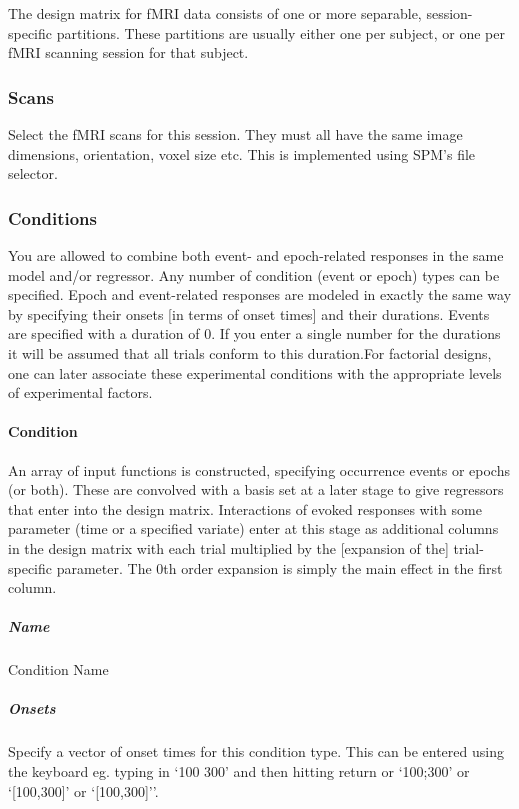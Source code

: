 The design matrix for fMRI data consists of one or more separable, session-specific partitions.  These partitions are usually either one per subject, or one per fMRI scanning session for that subject.

\subsubsection{Scans}

Select the fMRI scans for this session.  They must all have the same image dimensions, orientation, voxel size etc. This is implemented using SPM's file selector.

\subsubsection{Conditions}

You are allowed to combine both event- and epoch-related responses in the same model and/or regressor. Any number of condition (event or epoch) types can be specified.  Epoch and event-related responses are modeled in exactly the same way by specifying their onsets [in terms of onset times] and their durations.  Events are specified with a duration of 0.  If you enter a single number for the durations it will be assumed that all trials conform to this duration.For factorial designs, one can later associate these experimental conditions with the appropriate levels of experimental factors. 

\paragraph{Condition}

An array of input functions is constructed, specifying occurrence events or epochs (or both). These are convolved with a basis set at a later stage to give regressors that enter into the design matrix. Interactions of evoked responses with some parameter (time or a specified variate) enter at this stage as additional columns in the design matrix with each trial multiplied by the [expansion of the] trial-specific parameter. The 0th order expansion is simply the main effect in the first column.

\subparagraph{Name}

Condition Name

\subparagraph{Onsets}

Specify a vector of onset times for this condition type. This can be entered using the keyboard eg. typing in `100 300' and then hitting return or `100;300' or `[100,300]' or `[100,300]''.

